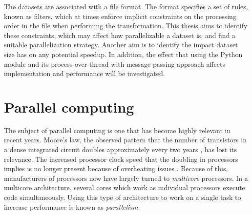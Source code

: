 The datasets are associated with a file format. The format specifies a set of rules, known as filters, which at times enforce
implicit constraints on the processing order in the file when performing the transformation. This thesis aims to identify these
constraints, which may affect how parallelizable a dataset is, and find a suitable parallelization strategy. Another aim is to identify the impact dataset size has on
any potential speedup. In addition, the effect that using the Python  module and its process-over-thread with message passing
approach affects implementation and performance will be investigated.


\section{Parallel computing}
The subject of parallel computing is one that has become highly relevant in recent years.
Moore's law, the observed pattern that the number of transistors in a dense integrated circuit doubles approximately every two
years \cite{moore_1998_cramming_cmcoic},
has lost its relevance. The increased processor clock speed that the doubling in processors implies is no longer present because of
overheating issues \cite[p. 1]{herlihy_2012_art_taomprr}. Because of this, manufacturers of processors now have
largely turned to \emph{multicore} processors. In a multicore architecture, several cores which work as individual processors execute
code simultaneously. Using this type of architecture to work on a single task to increase performance is known as \emph{parallelism}.

